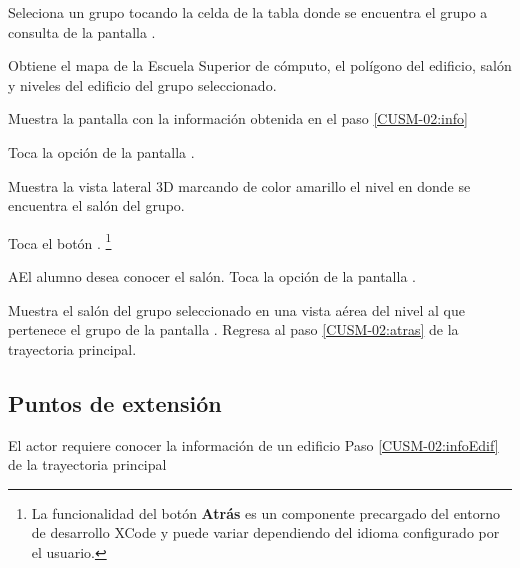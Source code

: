  \begin{UCtrayectoria}
 \UCpaso[\UCactor] Seleciona un grupo tocando la celda de la tabla donde se encuentra el grupo a consulta de la pantalla .

\UCpaso[\UCsist] Obtiene el mapa  de la Escuela Superior de cómputo, el polígono del edificio, salón y niveles del edificio del grupo seleccionado. \label{CUSM-02:info}

\UCpaso[\UCsist] Muestra la pantalla  con la información obtenida en el paso \ref{CUSM-02:info} \label{CUSM-02:infoEdif}

\UCpaso[\UCactor] Toca la opción  de la pantalla .  

\UCpaso[\UCsist] Muestra la vista lateral 3D marcando de color amarillo el nivel  en donde se encuentra el salón del grupo.

\UCpaso[\UCactor] Toca el botón . \label{CUSM-02:atras} \footnote{La funcionalidad del botón \textbf{Atrás} es un componente precargado del entorno de desarrollo XCode y puede variar dependiendo del idioma configurado por el usuario.}

 \end{UCtrayectoria}

 \begin{UCtrayectoriaA}{A}{El alumno desea conocer el salón.}
	\UCpaso[\UCactor] Toca la opción  de la pantalla  .
	
	\UCpaso[\UCsist] Muestra el salón del grupo seleccionado en una vista aérea del nivel al que pertenece el grupo de la pantalla .
	\UCpaso[\UCsist] Regresa al paso \ref{CUSM-02:atras} de la trayectoria principal.
\end{UCtrayectoriaA}




%    
%   
% 

 
\subsection{Puntos de extensión}
%
\UCExtensionPoint
{El actor requiere conocer la información de un edificio}
{ Paso \ref{CUSM-02:infoEdif} de la trayectoria principal}
{}
 